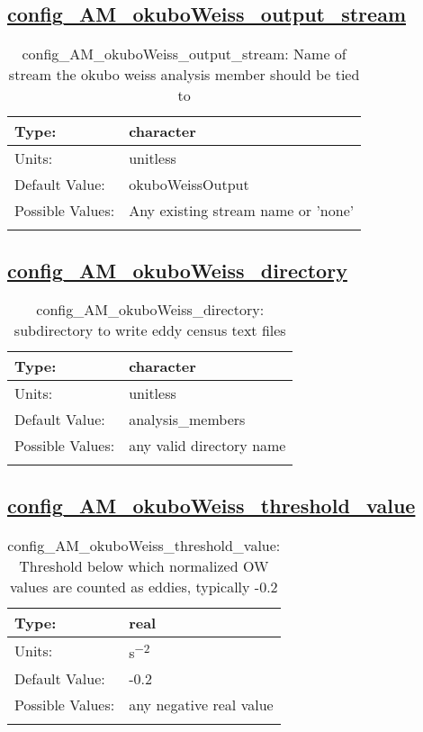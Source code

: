\subsection[config\_AM\_okuboWeiss\_output\_stream]{\hyperref[sec:nm_tab_AM_okuboWeiss]{config\_AM\_okuboWeiss\_output\_stream}}
\label{subsec:nm_sec_config_AM_okuboWeiss_output_stream}
\begin{center}
\begin{longtable}{| p{2.0in} || p{4.0in} |}
    \hline
    Type: & character \\
    \hline
    Units: & \si{unitless} \\
    \hline
    Default Value: & okuboWeissOutput \\
    \hline
    Possible Values: & Any existing stream name or 'none' \\
    \hline
    \caption{config\_AM\_okuboWeiss\_output\_stream: Name of stream the okubo weiss analysis member should be tied to}
\end{longtable}
\end{center}
\subsection[config\_AM\_okuboWeiss\_directory]{\hyperref[sec:nm_tab_AM_okuboWeiss]{config\_AM\_okuboWeiss\_directory}}
\label{subsec:nm_sec_config_AM_okuboWeiss_directory}
\begin{center}
\begin{longtable}{| p{2.0in} || p{4.0in} |}
    \hline
    Type: & character \\
    \hline
    Units: & \si{unitless} \\
    \hline
    Default Value: & analysis\_members \\
    \hline
    Possible Values: & any valid directory name \\
    \hline
    \caption{config\_AM\_okuboWeiss\_directory: subdirectory to write eddy census text files}
\end{longtable}
\end{center}
\subsection[config\_AM\_okuboWeiss\_threshold\_value]{\hyperref[sec:nm_tab_AM_okuboWeiss]{config\_AM\_okuboWeiss\_threshold\_value}}
\label{subsec:nm_sec_config_AM_okuboWeiss_threshold_value}
\begin{center}
\begin{longtable}{| p{2.0in} || p{4.0in} |}
    \hline
    Type: & real \\
    \hline
    Units: & \si{s^{-2}} \\
    \hline
    Default Value: & -0.2 \\
    \hline
    Possible Values: & any negative real value \\
    \hline
    \caption{config\_AM\_okuboWeiss\_threshold\_value: Threshold below which normalized OW values are counted as eddies, typically -0.2}
\end{longtable}
\end{center}
